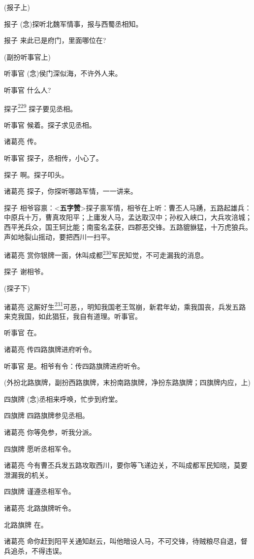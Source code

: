 (报子上)

报子 (念)探听北魏军情事，报与西蜀丞相知。

报子 来此已是府门，里面哪位在?

(副扮听事官上)

听事官 (念)侯门深似海，不许外人来。

听事官 什么人?

探子\protect\hyperlink{fn229}{\textsuperscript{229}} 探子要见丞相。

听事官 候着。探子求见丞相。

诸葛亮 传。

听事官 探子，丞相传，小心了。

探子 啊。探子叩头。

诸葛亮 探子，你探听哪路军情，一一讲来。

探子
相爷容禀：\textless{}\textbf{五字赞}\textgreater{}探子禀军情，相爷在上听：曹丕人马踴，五路起雄兵：中原兵十万，曹真攻阳平；上庸发人马，孟达取汉中；孙权入峡口，大兵攻涪城；西平羌兵众，国王轲比能；南蛮名孟获，四郡恶交锋。五路貔貅猛，十万虎狼兵。声如地裂山摇动，要把西川一扫平。

诸葛亮
赏你银牌一面，休叫成都\protect\hyperlink{fn230}{\textsuperscript{230}}军民知觉，不可走漏我的消息。

探子 谢相爷。

(探子下)

诸葛亮
这厮好生\protect\hyperlink{fn231}{\textsuperscript{231}}可恶，，明知我国老王驾崩，新君年幼，乘我国丧，兵发五路来克我国，如此猖狂，我自有道理。听事官。

听事官 在。

诸葛亮 传四路旗牌进府听令。

听事官 是。相爷有令：传四路旗牌进府听令。

(外扮北路旗牌，副扮西路旗牌，末扮南路旗牌，净扮东路旗牌；四旗牌内应，上)

四旗牌 (念)丞相来呼唤，忙步到府堂。

四旗牌 四路旗牌参见丞相。

诸葛亮 你等免参，听我分派。

四旗牌 愿听丞相军令。

诸葛亮
今有曹丕兵发五路攻取西川，要你等飞递边关，不叫成都军民知晓，莫要泄漏我的机关。

四旗牌 谨遵丞相军令。

诸葛亮 北路旗牌听令。

北路旗牌 在。

诸葛亮
命你赶到阳平关通知赵云，叫他暗设人马，不可交锋，待贼粮尽自退，督兵追杀，不得违误。

